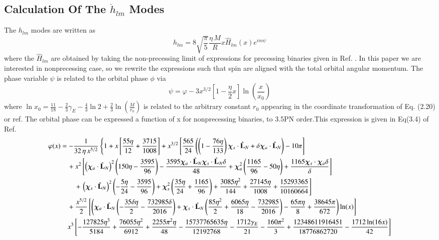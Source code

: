 \documentclass[twocolumn,showpacs,aps,prd,nobibnotes,floatfix]{revtex4-1}
\begin{document}
\begin{widetext}
\section{Calculation Of The $\dot{h}_{lm}$ Modes}\label{Appendix B}
The $h_{lm}$ modes are written as 
\begin{equation}\label{eq:B1}
	h_{lm}=8\sqrt{\frac{\pi}{5}}\frac{\eta\,M}{R}x\hat{H}_{lm}(x)e^{\mathit{i}m\psi}
\end{equation}
where the $\hat{H}_{lm}$ are obtained by taking the non-precessing limit of expressions for precessing binaries given in Ref.\cite{Arun2009} . In this paper we are interested in nonprecessing case, so we rewrite the expressions such that spin are aligned with the total orbital angular momentum. The phase variable $\psi$ is related to the orbital phase $\phi$ via
\begin{equation}
	\psi=\varphi - 3x^{3/2}\left[1-\frac{\eta}{2}x\right]\ln\left(\frac{x}{x_0}\right)
\end{equation}
where $\ln x_0 = \frac{11}{18} - \frac{2}{3}\gamma_E -\frac{4}{3}\ln2 + \frac{2}{3}\ln\left(\frac{M}{r_0}\right)$ is related to the arbitrary constant $r_0$ appearing in the coordinate transformation of Eq. (2.20) or ref\cite{Favata2009}. The orbital phase can be expressed a function of x for nonprecessing binaries, to 3.5PN order.This expression is given in Eq(3.4) of Ref. \cite{Ajith_2011}
\begin{align}
\varphi(x)& = -\frac{1}{32\,\eta\,x^{5/2}}\left\{1+x\left[\frac{55\eta}{12}+\frac{3715}{1008}\right]+x^{3/2}\left[\frac{565}{24}\left(\left(1-\frac{76\eta}{133}\right)\chisdL + \delta\chiadL\right)-10\pi\right]\right.\nonumber\\
&\quad + x^2\left[\left(\chiadL\right)^2\left(150\eta-\frac{3595}{96}\right)-\frac{3595\chiadL\chisdL\delta}{48} + \chiaSqr\left(\frac{1165}{96}- 50\eta\right) + \frac{1165\chisDchia\delta}{\delta}\right]\nonumber\\
&\qquad + \left.\left(\chisdL\right)^2\left(-\frac{5\eta}{24} - \frac{3595}{96}\right) + \chisSqr\left(\frac{35\eta}{24}+\frac{1165}{96}\right) + \frac{3085\eta^2}{144} + \frac{27145\eta}{1008} + \frac{15293365}{10160664}\right]\nonumber\\
&\quad +  \frac{x^{5/2}}{2}\left[\left(\chiadL\left(-\frac{35\delta\eta}{2} - \frac{732985\delta}{2016}\right) + \chisdL\left(\frac{85\eta^2}{2} + \frac{6065\eta}{18} - \frac{732985}{2016}\right) -\frac{65\pi\eta}{8} + \frac{38645\pi}{672}\right)\ln(x)\right]\nonumber\\
&\quad x^3\left[-\frac{127825\eta^3}{5184} + \frac{76055\eta^2}{6912} + \frac{2255\pi^2\eta}{48} - \frac{15737765635\eta}{12192768} - \frac{1712\gamma_E}{21} -\frac{160\pi^2}{3} + \frac{12348611916451}{18776862720} - \frac{1712\ln(16x)}{42}\right]\nonumber\\

\end{align}
\end{widetext}
\end{document}
